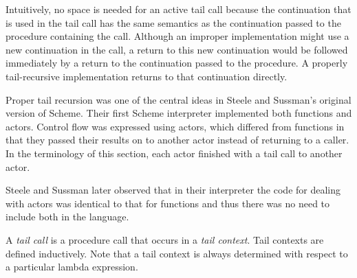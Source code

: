 \begin{rationale}

Intuitively, no space is needed for an active tail call because the
continuation that is used in the tail call has the same semantics as the
continuation passed to the procedure containing the call.  Although an improper
implementation might use a new continuation in the call, a return
to this new continuation would be followed immediately by a return
to the continuation passed to the procedure.  A properly tail-recursive
implementation returns to that continuation directly.

Proper tail recursion was one of the central ideas in Steele and
Sussman's original version of Scheme.  Their first Scheme interpreter
implemented both functions and actors.  Control flow was expressed using
actors, which differed from functions in that they passed their results
on to another actor instead of returning to a caller.  In the terminology
of this section, each actor finished with a tail call to another actor.

Steele and Sussman later observed that in their interpreter the code
for dealing with actors was identical to that for functions and thus
there was no need to include both in the language.

\end{rationale}

A {\em tail call} is a procedure call that occurs
in a {\em tail context}.  Tail contexts are defined inductively.  Note
that a tail context is always determined with respect to a particular lambda
expression.

